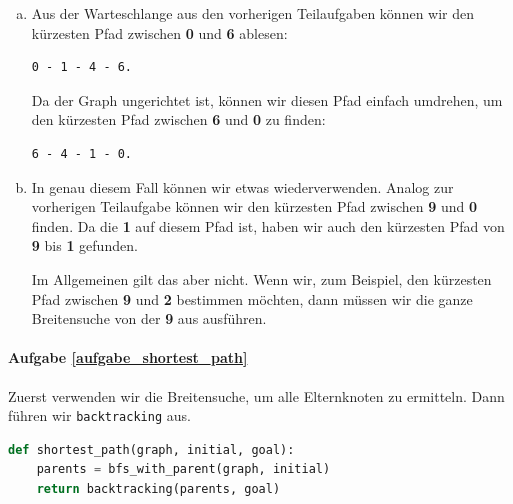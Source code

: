 \begin{enumerate}[(a)]
\item Aus der Warteschlange aus den vorherigen Teilaufgaben können wir den kürzesten Pfad zwischen \textbf{0} und \textbf{6} ablesen:
\begin{lstlisting}[mathescape]
0 - 1 - 4 - 6.
\end{lstlisting}
Da der Graph ungerichtet ist, können wir diesen Pfad einfach umdrehen, um den kürzesten Pfad zwischen \textbf{6} und \textbf{0} zu finden:
\begin{lstlisting}[mathescape]
6 - 4 - 1 - 0.
\end{lstlisting}

\item In genau diesem Fall können wir etwas wiederverwenden. Analog zur vorherigen Teilaufgabe können wir den kürzesten Pfad zwischen \textbf{9} und \textbf{0} finden. Da die \textbf{1} auf diesem Pfad ist, haben wir auch den kürzesten Pfad von \textbf{9} bis \textbf{1} gefunden.

Im Allgemeinen gilt das aber nicht. Wenn wir, zum Beispiel, den kürzesten Pfad zwischen \textbf{9} und \textbf{2} bestimmen möchten, dann müssen wir die ganze Breitensuche von der \textbf{9} aus ausführen.
\end{enumerate}

\paragraph{Aufgabe \ref{aufgabe_shortest_path}}
Zuerst verwenden wir die Breitensuche, um alle Elternknoten zu ermitteln. Dann führen wir \texttt{backtracking} aus.
\begin{lstlisting}[language=Python]
def shortest_path(graph, initial, goal):
    parents = bfs_with_parent(graph, initial)
    return backtracking(parents, goal)
\end{lstlisting}

